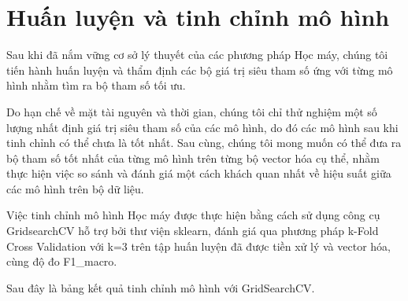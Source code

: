 \documentclass[12pt,a4paper,oneside]{book}
\begin{document}
	\section{Huấn luyện và tinh chỉnh mô hình}
		Sau khi đã nắm vững cơ sở lý thuyết của các phương pháp Học máy, chúng tôi tiến hành huấn luyện và thẩm định các bộ giá trị siêu tham số ứng với từng mô hình nhằm tìm ra bộ tham số tối ưu.
		
		Do hạn chế về mặt tài nguyên và thời gian, chúng tôi chỉ thử nghiệm một số lượng nhất định giá trị siêu tham số của các mô hình, do đó các mô hình sau khi tinh chỉnh có thể chưa là tốt nhất. Sau cùng, chúng tôi mong muốn có thể đưa ra bộ tham số tốt nhất của từng mô hình trên từng bộ vector hóa cụ thể, nhằm thực hiện việc so sánh và đánh giá một cách khách quan nhất về hiệu suất giữa các mô hình trên bộ dữ liệu.
		
		Việc tinh chỉnh mô hình Học máy được thực hiện bằng cách sử dụng công cụ GridsearchCV hỗ trợ bởi thư viện sklearn, đánh giá qua phương pháp k-Fold Cross Validation với k=3 trên tập huấn luyện đã được tiền xử lý và vector hóa, cùng độ đo F1\_macro.
	
		Sau đây là bảng kết quả tinh chỉnh mô hình với GridSearchCV.
	
\end{document}
